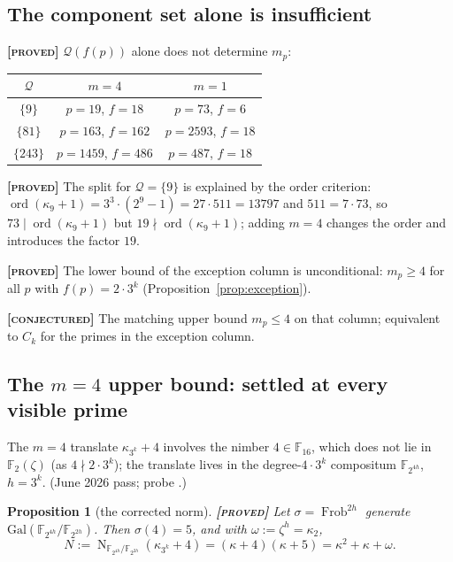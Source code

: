 \documentclass[11pt]{article}
\theoremstyle{plain}
\newtheorem{proposition}{Proposition}
\theoremstyle{definition}
\newcommand{\F}{\mathbb{F}}
\newcommand{\ord}{\operatorname{ord}}
\newcommand{\Norm}{\operatorname{N}}
\newcommand{\Frob}{\operatorname{Frob}}
\newcommand{\Qset}{\mathcal{Q}}
\newcommand{\PROVED}{\textbf{[\textsc{proved}]}}
\newcommand{\CONJECTURED}{\textbf{[\textsc{conjectured}]}}
\begin{document}
\subsection{The component set alone is insufficient}

\PROVED{} $\Qset(f(p))$ alone does not determine $m_p$:
\begin{center}
\begin{tabular}{ccc}
\toprule
$\Qset$ & $m=4$ & $m=1$ \\
\midrule
$\{9\}$   & $p=19$,   $f=18$  & $p=73$,   $f=6$ \\
$\{81\}$  & $p=163$,  $f=162$ & $p=2593$, $f=18$ \\
$\{243\}$ & $p=1459$, $f=486$ & $p=487$,  $f=18$ \\
\bottomrule
\end{tabular}
\end{center}

\PROVED{} The split for $\Qset=\{9\}$ is explained by the order
criterion: $\ord(\kappa_9+1)=3^3\cdot(2^9-1)=27\cdot511=13797$ and
$511=7\cdot73$, so $73\mid\ord(\kappa_9+1)$ but
$19\nmid\ord(\kappa_9+1)$; adding $m=4$ changes the order and introduces
the factor $19$.

\PROVED{} The lower bound of the exception column is unconditional:
$m_p\geq4$ for all $p$ with $f(p)=2\cdot3^k$
(Proposition~\ref{prop:exception}).

\CONJECTURED{} The matching upper bound $m_p\leq4$ on that column;
equivalent to $C_k$ for the primes in the exception column.

\subsection{The $m=4$ upper bound: settled at every visible prime}
\label{sec:m4}

The $m=4$ translate $\kappa_{3^k}+4$ involves the nimber $4\in\F_{16}$,
which does not lie in $\F_2(\zeta)$ (as $4\nmid2\cdot3^k$); the
translate lives in the degree-$4\cdot3^k$ compositum $\F_{2^{4h}}$,
$h=3^k$. (June 2026 pass; probe
.)

\begin{proposition}[the corrected norm]\label{prop:m4norm}
\PROVED{} Let $\sigma=\Frob^{2h}$ generate
$\mathrm{Gal}(\F_{2^{4h}}/\F_{2^{2h}})$. Then $\sigma(4)=5$, and with
$\omega:=\zeta^{h}=\kappa_2$,
\[
  N:=\Norm_{\F_{2^{4h}}/\F_{2^{2h}}}(\kappa_{3^k}+4)
   =(\kappa+4)(\kappa+5)
   =\kappa^2+\kappa+\omega .
\]
\end{proposition}
\end{document}
